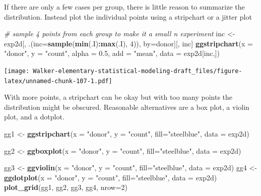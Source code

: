 \documentclass[]{book}
\newenvironment{Shaded}{\begin{snugshade}}{\end{snugshade}}
\newcommand{\CommentTok}[1]{\textcolor[rgb]{0.56,0.35,0.01}{\textit{#1}}}
\newcommand{\DataTypeTok}[1]{\textcolor[rgb]{0.13,0.29,0.53}{#1}}
\newcommand{\DecValTok}[1]{\textcolor[rgb]{0.00,0.00,0.81}{#1}}
\newcommand{\FloatTok}[1]{\textcolor[rgb]{0.00,0.00,0.81}{#1}}
\newcommand{\KeywordTok}[1]{\textcolor[rgb]{0.13,0.29,0.53}{\textbf{#1}}}
\newcommand{\NormalTok}[1]{#1}
\newcommand{\OperatorTok}[1]{\textcolor[rgb]{0.81,0.36,0.00}{\textbf{#1}}}
\newcommand{\StringTok}[1]{\textcolor[rgb]{0.31,0.60,0.02}{#1}}
\begin{document}
If there are only a few cases per group, there is little reason to summarize the distribution. Instead plot the individual points using a stripchart or a jitter plot

\begin{Shaded}
\begin{Highlighting}[]
\CommentTok{# sample 4 points from each group to make it a small n experiment}
\NormalTok{inc <-}\StringTok{ }\NormalTok{exp2d[, .(}\DataTypeTok{inc=}\KeywordTok{sample}\NormalTok{(}\KeywordTok{min}\NormalTok{(.I)}\OperatorTok{:}\KeywordTok{max}\NormalTok{(.I), }\DecValTok{4}\NormalTok{)), by=donor][, inc]}
\KeywordTok{ggstripchart}\NormalTok{(}\DataTypeTok{x =} \StringTok{"donor"}\NormalTok{,}
             \DataTypeTok{y =} \StringTok{"count"}\NormalTok{,}
             \DataTypeTok{alpha =} \FloatTok{0.5}\NormalTok{,}
             \DataTypeTok{add =} \StringTok{"mean"}\NormalTok{,}
             \DataTypeTok{data =}\NormalTok{ exp2d[inc,])}
\end{Highlighting}
\end{Shaded}

\texttt{[image: Walker-elementary-statistical-modeling-draft\_files/figure-latex/unnamed-chunk-107-1.pdf]}

With more points, a stripchart can be okay but with too many points the distribution might be obscured. Reasonable alternatives are a box plot, a violin plot, and a dotplot.

\begin{Shaded}
\begin{Highlighting}[]
\NormalTok{gg1 <-}\StringTok{ }\KeywordTok{ggstripchart}\NormalTok{(}\DataTypeTok{x =} \StringTok{"donor"}\NormalTok{,}
          \DataTypeTok{y =} \StringTok{"count"}\NormalTok{,}
          \DataTypeTok{fill=}\StringTok{"steelblue"}\NormalTok{,}
          \DataTypeTok{data =}\NormalTok{ exp2d)}

\NormalTok{gg2 <-}\StringTok{ }\KeywordTok{ggboxplot}\NormalTok{(}\DataTypeTok{x =} \StringTok{"donor"}\NormalTok{,}
          \DataTypeTok{y =} \StringTok{"count"}\NormalTok{,}
          \DataTypeTok{fill=}\StringTok{"steelblue"}\NormalTok{,}
          \DataTypeTok{data =}\NormalTok{ exp2d)}

\NormalTok{gg3 <-}\StringTok{ }\KeywordTok{ggviolin}\NormalTok{(}\DataTypeTok{x =} \StringTok{"donor"}\NormalTok{,}
          \DataTypeTok{y =} \StringTok{"count"}\NormalTok{,}
          \DataTypeTok{fill=}\StringTok{"steelblue"}\NormalTok{,}
          \DataTypeTok{data =}\NormalTok{ exp2d)}
\NormalTok{gg4 <-}\StringTok{ }\KeywordTok{ggdotplot}\NormalTok{(}\DataTypeTok{x =} \StringTok{"donor"}\NormalTok{,}
          \DataTypeTok{y =} \StringTok{"count"}\NormalTok{,}
          \DataTypeTok{fill=}\StringTok{"steelblue"}\NormalTok{,}
          \DataTypeTok{data =}\NormalTok{ exp2d)}
\KeywordTok{plot_grid}\NormalTok{(gg1, gg2, gg3, gg4, }\DataTypeTok{nrow=}\DecValTok{2}\NormalTok{)}
\end{Highlighting}
\end{Shaded}
\end{document}
